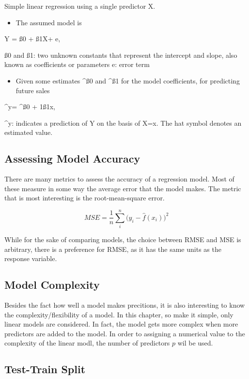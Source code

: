 \documentclass[]{report}
\providecommand{\tightlist}{%
  \setlength{\itemsep}{0pt}\setlength{\parskip}{0pt}}
\begin{document}
Simple linear regression using a single predictor X.

\begin{itemize}
\tightlist
\item
  The assumed model is
\end{itemize}

Y = ß0 + ß1X+ e,

ß0 and ß1: two unknown constants that represent the intercept and slope,
also known as coefficients or parameters e: error term

\begin{itemize}
\tightlist
\item
  Given some estimates \^{}ß0 and \^{}ß1 for the model coefficients, for
  predicting future sales
\end{itemize}

\^{}y= \^{}ß0 + 1ß1x,

\^{}y: indicates a prediction of Y on the basis of X=x. The hat symbol
denotes an estimated value.

\subsection{Assessing Model Accuracy}\label{assessing-model-accuracy}

There are many metrics to assess the accuracy of a regression model.
Most of these measure in some way the average error that the model
makes. The metric that is most interesting is the root-mean-square
error.

\[MSE=\frac{1}{n}\sum_i^n \big(y_i-\hat{f}(x_i)\big)^2\]

While for the sake of comparing models, the choice between RMSE and MSE
is arbitrary, there is a preference for RMSE, as it has the same units
as the response variable.

\subsection{Model Complexity}\label{model-complexity}

Besides the fact how well a model makes precitions, it is also
interesting to know the complexity/flexibility of a model. In this
chapter, so make it simple, only linear models are considered. In fact,
the model gets more complex when more predictors are added to the model.
In order to assigning a numerical value to the complexity of the linear
modl, the number of predictors \(p\) wil be used.

\subsection{Test-Train Split}\label{test-train-split}
\end{document}
